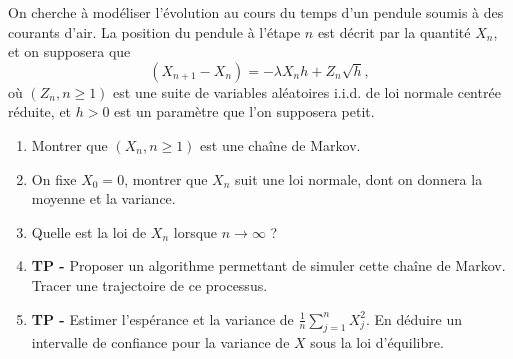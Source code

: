 \documentclass[solutions]{exercices}
\begin{document}
\begin{exercice}
	On cherche à modéliser l'évolution au cours du temps d'un pendule soumis à des courants d'air. La position du pendule à l'étape $n$ est décrit par la quantité $X_n$, et on supposera que
	\[
		(X_{n+1} - X_n)  = - \lambda X_n h + Z_n \sqrt{h},
	\]
	où $(Z_n, n \geq 1)$ est une suite de variables aléatoires i.i.d. de loi normale centrée réduite, et $h > 0$ est un paramètre que l'on supposera petit.
	\begin{enumerate}
		\item Montrer que $(X_n, n \geq 1)$ est une chaîne de Markov.
		\item On fixe $X_0=0$, montrer que $X_n$ suit une loi normale, dont on donnera la moyenne et la variance.
		\item Quelle est la loi de $X_n$ lorsque $n \to \infty$ ?
		\item \textbf{TP -} Proposer un algorithme permettant de simuler cette chaîne de Markov. Tracer une trajectoire de ce processus.
		\item \textbf{TP -} Estimer l'espérance et la variance de $\frac{1}{n} \sum_{j=1}^n X_j^2$. En déduire un intervalle de confiance pour la variance de $X$ sous la loi d'équilibre.
	\end{enumerate}
\end{exercice}
\end{document}
